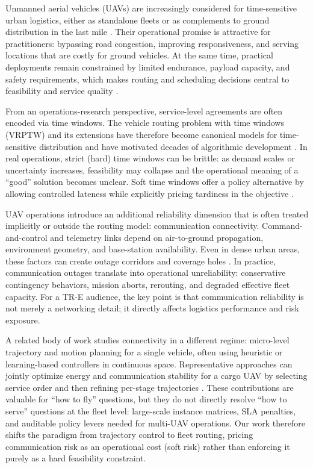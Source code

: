Unmanned aerial vehicles (UAVs) are increasingly considered for time-sensitive urban logistics, either as standalone fleets or as complements to ground distribution in the last mile \citep{murray2015,poikonen2017,otto2018}. Their operational promise is attractive for practitioners: bypassing road congestion, improving responsiveness, and serving locations that are costly for ground vehicles. At the same time, practical deployments remain constrained by limited endurance, payload capacity, and safety requirements, which makes routing and scheduling decisions central to feasibility and service quality \citep{dorling2017,tothvigo2014}.

From an operations-research perspective, service-level agreements are often encoded via time windows. The vehicle routing problem with time windows (VRPTW) and its extensions have therefore become canonical models for time-sensitive distribution and have motivated decades of algorithmic development \citep{solomon1987,desrochers1992,laporte2009}. In real operations, strict (hard) time windows can be brittle: as demand scales or uncertainty increases, feasibility may collapse and the operational meaning of a ``good'' solution becomes unclear. Soft time windows offer a policy alternative by allowing controlled lateness while explicitly pricing tardiness in the objective \citep{tothvigo2014,cordeau2002}.

UAV operations introduce an additional reliability dimension that is often treated implicitly or outside the routing model: communication connectivity. Command-and-control and telemetry links depend on air-to-ground propagation, environment geometry, and base-station availability. Even in dense urban areas, these factors can create outage corridors and coverage holes \citep{alhourani2014,zeng2016,mozaffari2016}. In practice, communication outages translate into operational unreliability: conservative contingency behaviors, mission aborts, rerouting, and degraded effective fleet capacity. For a TR-E audience, the key point is that communication reliability is not merely a networking detail; it directly affects logistics performance and risk exposure.

A related body of work studies connectivity in a different regime: micro-level trajectory and motion planning for a single vehicle, often using heuristic or learning-based controllers in continuous space. Representative approaches can jointly optimize energy and communication stability for a cargo UAV by selecting service order and then refining per-stage trajectories \citep{huang2026tccn}. These contributions are valuable for ``how to fly'' questions, but they do not directly resolve ``how to serve'' questions at the fleet level: large-scale instance matrices, SLA penalties, and auditable policy levers needed for multi-UAV operations. Our work therefore shifts the paradigm from trajectory control to fleet routing, pricing communication risk as an operational cost (soft risk) rather than enforcing it purely as a hard feasibility constraint.


